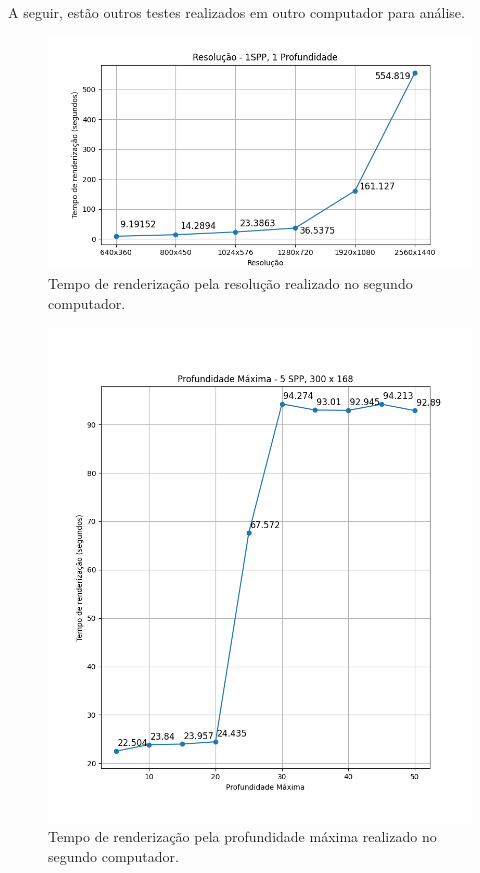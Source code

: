 \documentclass[journal]{IEEEtran}
\begin{document}
A seguir, estão outros testes realizados em outro computador para análise.

\begin{figure}[ht]
  \centering
  \includegraphics[width=\linewidth]{media/Notebook_RES.png}
  \caption{Tempo de renderização pela resolução realizado no segundo computador.}
  \label{img_notebook_res}
\end{figure}

\begin{figure}[ht]
  \centering
  \includegraphics[width=\linewidth]{media/Notebook_MD.png}
  \caption{Tempo de renderização pela profundidade máxima realizado no segundo computador.}
  \label{img_notebook_md}
\end{figure}
\end{document}
